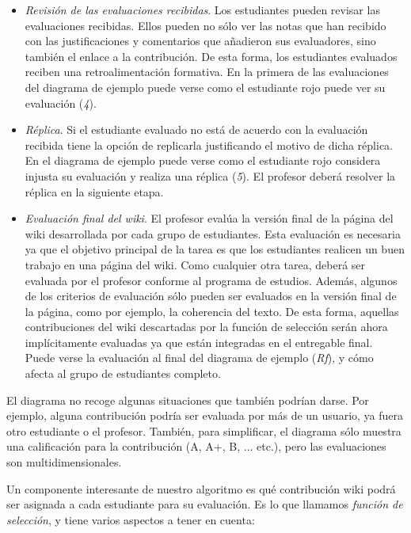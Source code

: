 \begin{itemize}
				\item \emph{Revisión de las evaluaciones recibidas}. Los estudiantes pueden revisar las evaluaciones recibidas. Ellos pueden no sólo ver las notas que han recibido con las justificaciones y comentarios que añadieron sus evaluadores, sino también el enlace a la contribución. De esta forma, los estudiantes evaluados reciben una retroalimentación formativa. En la primera de las evaluaciones del diagrama de ejemplo puede verse como el estudiante rojo puede ver su evaluación (\emph{4}).
				\item \emph{Réplica}. Si el estudiante evaluado no está de acuerdo con la evaluación recibida tiene la opción de replicarla justificando el motivo de dicha réplica. En el diagrama de ejemplo puede verse como el estudiante rojo considera injusta su evaluación y realiza una réplica (\emph{5}). El profesor deberá resolver la réplica en la siguiente etapa.
				\item \emph{Evaluación final del wiki}. El profesor evalúa la versión final de la página del wiki desarrollada por cada grupo de estudiantes. Esta evaluación es necesaria ya que el objetivo principal de la tarea es que los estudiantes realicen un buen trabajo en una página del wiki. Como cualquier otra tarea, deberá ser evaluada por el profesor conforme al programa de estudios. Además, algunos de los criterios de evaluación sólo pueden ser evaluados en la versión final de la página, como por ejemplo, la coherencia del texto. De esta forma, aquellas contribuciones del wiki descartadas por la función de selección serán ahora implícitamente evaluadas ya que están integradas en el entregable final. Puede verse la evaluación al final del diagrama de ejemplo (\emph{Rf}), y cómo afecta al grupo de estudiantes completo.
\end{itemize}

			El diagrama no recoge algunas situaciones que también podrían darse. Por ejemplo, alguna contribución podría ser evaluada por más de un usuario, ya fuera otro estudiante o el profesor. También, para simplificar, el diagrama sólo muestra una calificación para la contribución (A, A+, B, ... etc.), pero las evaluaciones son multidimensionales.

			Un componente interesante de nuestro algoritmo es qué contribución wiki podrá ser asignada a cada estudiante para su evaluación. Es lo que llamamos \emph{función de selección}, y tiene varios aspectos a tener en cuenta:

